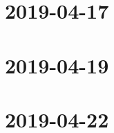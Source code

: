 \documentclass{ccg-notes}
\author{Colton Grainger}
\date{\today}
\begin{document}
\frontstuff

\section{2019-04-17}
    

\section{2019-04-19}
    

\section{2019-04-22}
    
\end{document}
